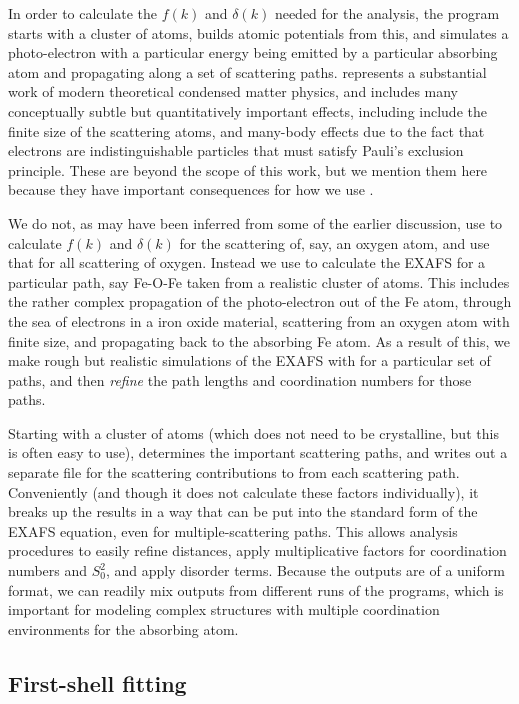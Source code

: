 In order to calculate the $f(k)$ and $\delta(k)$ needed for the analysis,
the {\feff} program\cite{feff6} starts with a cluster of atoms, builds
atomic potentials from this, and simulates a photo-electron with a
particular energy being emitted by a particular absorbing atom and
propagating along a set of scattering paths\cite{feffit}.  {\feff}
represents a substantial work of modern theoretical condensed matter
physics, and includes many conceptually subtle but quantitatively important
effects, including include the finite size of the scattering atoms, and
many-body effects due to the fact that electrons are indistinguishable
particles that must satisfy Pauli's exclusion
principle\cite{RehrAlbersRMP2000}.  These are beyond the scope of this
work, but we mention them here because they have important consequences for
how we use {\feff}.

We do not, as may have been inferred from some of the earlier discussion,
use {\feff} to calculate $f(k)$ and $\delta(k)$ for the scattering of, say,
an oxygen atom, and use that for all scattering of oxygen.  Instead we use
{\feff} to calculate the EXAFS for a particular path, say Fe-O-Fe taken
from a realistic cluster of atoms.  This includes the rather complex
propagation of the photo-electron out of the Fe atom, through the sea of
electrons in a iron oxide material, scattering from an oxygen atom with
finite size, and propagating back to the absorbing Fe atom.  As a result of
this, we make rough but realistic simulations of the EXAFS with {\feff} for
a particular set of paths, and then {\emph{refine}} the path lengths and
coordination numbers for those paths.

Starting with a cluster of atoms (which does not need to be crystalline, but
this is often easy to use), {\feff} determines the important scattering
paths, and writes out a separate file for the scattering contributions to
from each scattering path.  Conveniently (and though it does not calculate
these factors individually), it breaks up the results in a way that can be
put into the standard form of the EXAFS equation, even for
multiple-scattering paths.  This allows analysis procedures to easily
refine distances, apply multiplicative factors for coordination numbers and
$S_0^2$,  and apply disorder terms.  Because the outputs are of a uniform
format, we can readily mix outputs from different runs of the programs,
which is important for modeling complex structures with multiple
coordination environments for the absorbing atom.

\subsection{First-shell fitting}

